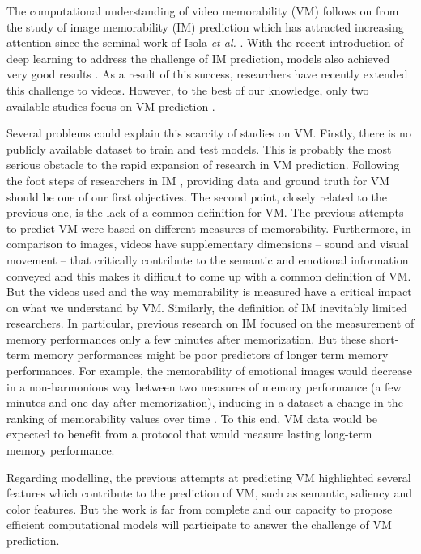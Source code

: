 \documentclass[sigconf]{acmart}
\begin{document}
The computational understanding of video memorability (VM) follows on from the study of image memorability (IM) prediction which has attracted increasing attention since the seminal work of Isola \textit{et al.} \cite{isola_2011_makes}.
With the recent introduction of deep learning to address the challenge of IM prediction, models also achieved very good results \cite{khosla_2015_understanding,baveye_2016_deep,squalli_2017_deep}.
As a result of this success, researchers have recently extended this challenge to videos.
However, to the best of our knowledge, only two available studies focus on VM prediction \cite{han_2015_learning,shekhar_2017_show}.

Several problems could explain this scarcity of studies on VM.
Firstly, there is no publicly available dataset to train and test models.
This is probably the most serious obstacle to the rapid expansion of research in VM prediction.
Following the foot steps of researchers in IM \cite{isola_2011_makes,khosla_2015_understanding}, providing data and ground truth for VM should be one of our first objectives.
The second point, closely related to the previous one, is the lack of a common definition for VM.
The previous attempts to predict VM \cite{han_2015_learning,shekhar_2017_show} were based on different measures of memorability.
Furthermore, in comparison to images, videos have supplementary dimensions -- sound and visual movement -- that critically contribute to the semantic and emotional information conveyed and this makes it difficult to come up with a common definition of VM.
But the videos used and the way memorability is measured have a critical impact on what we understand by VM.
Similarly, the definition of IM \cite{isola_2011_makes} inevitably limited researchers.
In particular, previous research on IM focused on the measurement of memory performances only a few minutes after memorization.
But these short-term memory performances might be poor predictors of longer term memory performances.
For example, the memorability of emotional images would decrease in a non-harmonious way between two measures of memory performance (a few minutes and one day after memorization), inducing in a dataset a change in the ranking of memorability values over time \cite{cohendet_2016_prediction}.
To this end, VM data would be expected to benefit from a protocol that would measure lasting long-term memory performance.

Regarding modelling, the previous attempts at predicting VM \cite{han_2015_learning,shekhar_2017_show} highlighted several features which contribute to the prediction of VM, such as semantic, saliency and color features.
But the work is far from complete and our capacity to propose efficient computational models will participate to answer the challenge of VM prediction.
\end{document}
